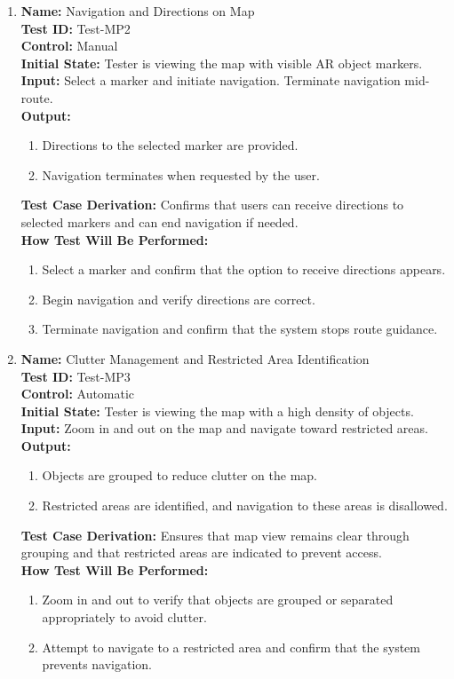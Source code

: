 \documentclass[12pt, titlepage]{article}
\begin{document}
\begin{enumerate}
  \item \textbf{Name:} Navigation and Directions on Map \label{itm:Test-MP2} \\
  \textbf{Test ID:} Test-MP2 \\
  \textbf{Control:} Manual \\
  \textbf{Initial State:} Tester is viewing the map with visible AR object markers. \\
  \textbf{Input:} Select a marker and initiate navigation. Terminate navigation mid-route. \\
  \textbf{Output:}
  \begin{enumerate}
    \item Directions to the selected marker are provided.
    \item Navigation terminates when requested by the user.
  \end{enumerate}
  \textbf{Test Case Derivation:} Confirms that users can receive directions to selected markers and can end navigation if needed. \\
  \textbf{How Test Will Be Performed:}
  \begin{enumerate}
    \item Select a marker and confirm that the option to receive directions appears.
    \item Begin navigation and verify directions are correct.
    \item Terminate navigation and confirm that the system stops route guidance.
  \end{enumerate}

  \item \textbf{Name:} Clutter Management and Restricted Area Identification \label{itm:Test-MP3} \\
  \textbf{Test ID:} Test-MP3 \\
  \textbf{Control:} Automatic \\
  \textbf{Initial State:} Tester is viewing the map with a high density of objects. \\
  \textbf{Input:} Zoom in and out on the map and navigate toward restricted areas. \\
  \textbf{Output:}
  \begin{enumerate}
    \item Objects are grouped to reduce clutter on the map.
    \item Restricted areas are identified, and navigation to these areas is disallowed.
  \end{enumerate}
  \textbf{Test Case Derivation:} Ensures that map view remains clear through grouping and that restricted areas are indicated to prevent access. \\
  \textbf{How Test Will Be Performed:}
  \begin{enumerate}
    \item Zoom in and out to verify that objects are grouped or separated appropriately to avoid clutter.
    \item Attempt to navigate to a restricted area and confirm that the system prevents navigation.
  \end{enumerate}

\end{enumerate}
\end{document}
